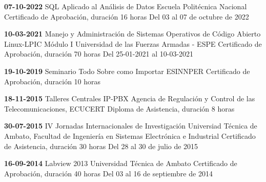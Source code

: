 \begin{devent}
    \cvevent
	{\textbf{07-10-2022}}
	{SQL Aplicado al Análisis de Datos}
	{Escuela Politécnica Nacional}
	{Certificado de Aprobación, duración 16 horas}
	{Del 03 al 07 de octubre de 2022}
\end{devent}

\begin{devent}
    \cvevent
	{\textbf{10-03-2021}}
	{Manejo y Administración de Sistemas Operativos de Código Abierto Linux-LPIC Módulo I}
	{Universidad de las Fuerzas Armadas - ESPE}
	{Certificado de Aprobación, duración 70 horas}
	{Del 25-01-2021 al 10-03-2021}
\end{devent}


\begin{levent}
    \cvevent
	{\textbf{19-10-2019}}
	{Seminario Todo Sobre como Importar}
	{ESINNPER}
	{Certificado de Aprobación, duración 10 horas}
	{}
\end{levent}

\begin{devent}
    \cvevent
	{\textbf{18-11-2015}}
	{Talleres Centrales IP-PBX}
	{Agencia de Regulación y Control de las Telecomunicaciones, ECUCERT}
	{Diploma de Asistencia, duración 8 horas}
	{}
\end{devent}

\begin{levent}
\cvevent
	{\textbf{30-07-2015}}
	{IV Jornadas Internacionales de Investigación}
	{Universiad Técnica de Ambato, Facultad de Ingeniería en Sistemas Electrónica e Industrial}
	{Certificado de Asistencia, duración 30 horas}
	{Del 28 al 30 de julio de 2015}
\end{levent}


\begin{devent}
    \cvevent
	{\textbf{16-09-2014}}
	{Labview 2013}
	{Universidad Técnica de Ambato}
	{Certificado de Aprobación, duración 40 horas}
	{Del 03 al 16 de septiembre de 2014}
\end{devent}

